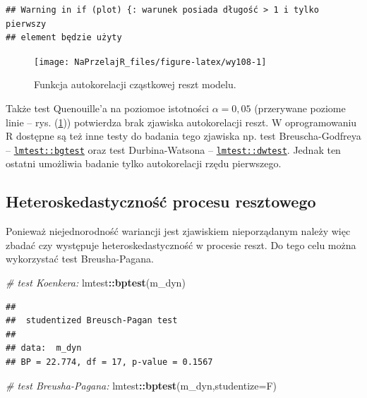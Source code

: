 \documentclass[polish,]{book}
\newenvironment{Shaded}{\begin{snugshade}}{\end{snugshade}}
\newcommand{\CommentTok}[1]{\textcolor[rgb]{0.56,0.35,0.01}{\textit{#1}}}
\newcommand{\DataTypeTok}[1]{\textcolor[rgb]{0.13,0.29,0.53}{#1}}
\newcommand{\KeywordTok}[1]{\textcolor[rgb]{0.13,0.29,0.53}{\textbf{#1}}}
\newcommand{\NormalTok}[1]{#1}
\newcommand{\OperatorTok}[1]{\textcolor[rgb]{0.81,0.36,0.00}{\textbf{#1}}}
\begin{document}
\begin{verbatim}
## Warning in if (plot) {: warunek posiada długość > 1 i tylko pierwszy
## element będzie użyty
\end{verbatim}

\begin{figure}[h]

{\centering \texttt{[image: NaPrzelajR\_files/figure-latex/wy108-1]} 

}

\caption{Funkcja autokorelacji cząstkowej reszt modelu.}\label{fig:wy108}
\end{figure}

Także test Quenouille'a na poziomoe istotności \(\alpha = 0,05\) (przerywane poziome
linie -- rys. (\ref{fig:wy108})) potwierdza brak zjawiska autokorelacji reszt. W oprogramowaniu R dostępne są też inne testy do badania tego zjawiska np. test Breuscha-Godfreya -- \href{https://rdrr.io/cran/lmtest/man/bgtest.html}{\texttt{lmtest::bgtest}}
oraz test Durbina-Watsona -- \href{https://rdrr.io/cran/lmtest/man/dwtest.html}{\texttt{lmtest::dwtest}}. Jednak
ten ostatni umożliwia badanie tylko autokorelacji rzędu pierwszego.

\hypertarget{part_10.4.3}{%
\subsection{Heteroskedastyczność procesu resztowego}\label{part_10.4.3}}

Ponieważ niejednorodność wariancji jest zjawiskiem nieporządanym należy więc zbadać czy występuje heteroskedastyczność w procesie reszt. Do tego celu można wykorzystać test Breusha-Pagana.

\begin{Shaded}
\begin{Highlighting}[]
\CommentTok{# test Koenkera:}
\NormalTok{lmtest}\OperatorTok{::}\KeywordTok{bptest}\NormalTok{(m_dyn)}
\end{Highlighting}
\end{Shaded}

\begin{verbatim}
## 
##  studentized Breusch-Pagan test
## 
## data:  m_dyn
## BP = 22.774, df = 17, p-value = 0.1567
\end{verbatim}

\begin{Shaded}
\begin{Highlighting}[]
\CommentTok{# test Breusha-Pagana:}
\NormalTok{lmtest}\OperatorTok{::}\KeywordTok{bptest}\NormalTok{(m_dyn,}\DataTypeTok{studentize=}\NormalTok{F)}
\end{Highlighting}
\end{Shaded}
\end{document}

